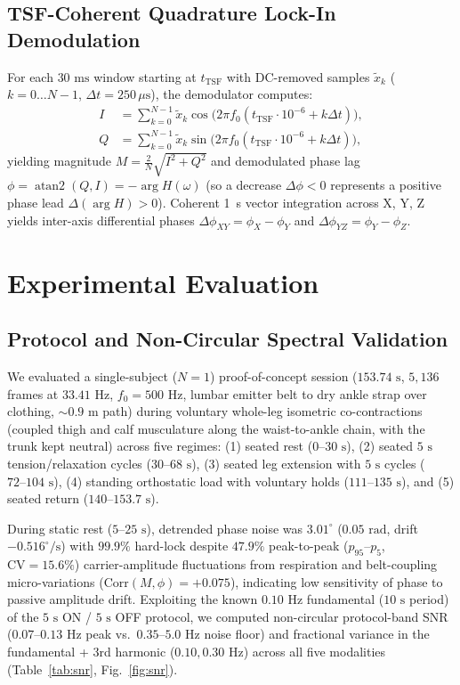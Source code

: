 \documentclass[conference]{IEEEtran}
\begin{document}
\subsection{TSF-Coherent Quadrature Lock-In Demodulation}
For each $30\text{ ms}$ window starting at $t_{\text{TSF}}$ with DC-removed samples $\tilde{x}_k$ ($k=0\dots N-1$, $\Delta t = 250\,\mu\text{s}$), the demodulator computes:
\begin{align}
I &= \sum_{k=0}^{N-1} \tilde{x}_k \cos\!\big(2\pi f_0 (t_{\text{TSF}}\cdot 10^{-6} + k\Delta t)\big), \\
Q &= \sum_{k=0}^{N-1} \tilde{x}_k \sin\!\big(2\pi f_0 (t_{\text{TSF}}\cdot 10^{-6} + k\Delta t)\big),
\end{align}
yielding magnitude $M = \frac{2}{N}\sqrt{I^2+Q^2}$ and demodulated phase lag $\phi = \operatorname{atan2}(Q,I) = -\arg H(\omega)$ (so a decrease $\Delta\phi < 0$ represents a positive phase lead $\Delta(\arg H) > 0$). Coherent 1~s vector integration across X, Y, Z yields inter-axis differential phases $\Delta\phi_{XY} = \phi_X - \phi_Y$ and $\Delta\phi_{YZ} = \phi_Y - \phi_Z$.

\section{Experimental Evaluation}

\subsection{Protocol and Non-Circular Spectral Validation}
We evaluated a single-subject ($N=1$) proof-of-concept session ($153.74\text{ s}$, $5{,}136$ frames at $33.41\text{ Hz}$, $f_0 = 500\text{ Hz}$, lumbar emitter belt to dry ankle strap over clothing, $\sim 0.9\text{ m}$ path) during voluntary whole-leg isometric co-contractions (coupled thigh and calf musculature along the waist-to-ankle chain, with the trunk kept neutral) across five regimes: (1) seated rest ($0\text{--}30\text{ s}$), (2) seated $5\text{ s}$ tension/relaxation cycles ($30\text{--}68\text{ s}$), (3) seated leg extension with $5\text{ s}$ cycles ($72\text{--}104\text{ s}$), (4) standing orthostatic load with voluntary holds ($111\text{--}135\text{ s}$), and (5) seated return ($140\text{--}153.7\text{ s}$).

During static rest ($5\text{--}25\text{ s}$), detrended phase noise was $3.01^\circ$ ($0.05\text{ rad}$, drift $-0.516^\circ/\text{s}$) with $99.9\%$ hard-lock despite $47.9\%$ peak-to-peak ($p_{95}\text{--}p_5$, $\text{CV}=15.6\%$) carrier-amplitude fluctuations from respiration and belt-coupling micro-variations ($\text{Corr}(M,\phi)=+0.075$), indicating low sensitivity of phase to passive amplitude drift. Exploiting the known $0.10\text{ Hz}$ fundamental ($10\text{ s}$ period) of the $5\text{ s}$ ON / $5\text{ s}$ OFF protocol, we computed non-circular protocol-band SNR ($0.07\text{--}0.13\text{ Hz}$ peak vs.\ $0.35\text{--}5.0\text{ Hz}$ noise floor) and fractional variance in the fundamental + 3rd harmonic ($0.10, 0.30\text{ Hz}$) across all five modalities (Table~\ref{tab:snr}, Fig.~\ref{fig:snr}).
\end{document}
